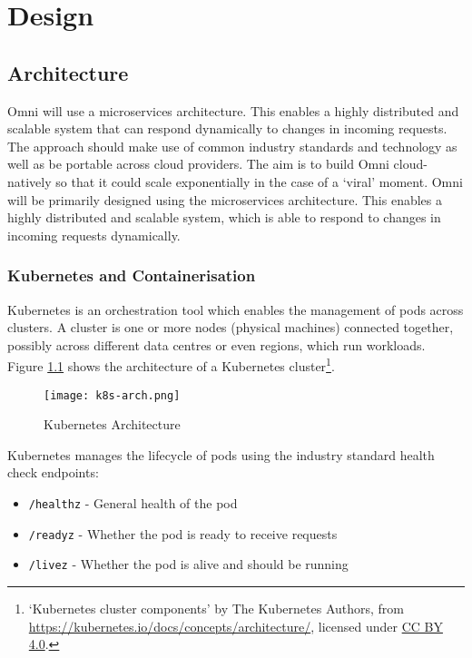 \chapter{Design}
\label{cha:design}

\section{Architecture}
\label{sec:design-architecture}
Omni will use a microservices architecture. This enables a highly distributed and scalable system that can respond dynamically to changes in incoming requests.
The approach should make use of common industry standards and technology as well as be portable across cloud providers. The aim is to build Omni cloud-natively so that it could scale exponentially in the case of a `viral' moment.
Omni will be primarily designed using the microservices architecture. This enables a highly distributed and scalable system, which is able to respond to changes in incoming requests dynamically. 

\subsection{Kubernetes and Containerisation}
\label{sec:design-system-kubernetes}
Kubernetes is an orchestration tool which enables the management of pods across clusters. A cluster is one or more nodes (physical machines) connected together, possibly across different data centres or even regions, which run workloads.
Figure \ref{fig:k8s-arch} shows the architecture of a Kubernetes cluster\footnote{`Kubernetes cluster components' by The Kubernetes Authors, from \url{https://kubernetes.io/docs/concepts/architecture/}, licensed under \href{https://creativecommons.org/licenses/by/4.0/}{CC BY 4.0}.}.

\begin{figure}[htbp]
\texttt{[image: k8s-arch.png]}
\centering
\caption{Kubernetes Architecture}
\label{fig:k8s-arch}
\end{figure}

Kubernetes manages the lifecycle of pods using the industry standard health check endpoints:
\begin{itemize}
    \item \texttt{/healthz} - General health of the pod
    \item \texttt{/readyz} - Whether the pod is ready to receive requests
    \item \texttt{/livez} - Whether the pod is alive and should be running
\end{itemize}

